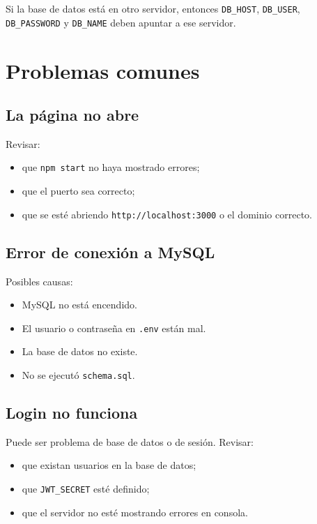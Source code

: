 \documentclass[12pt,letterpaper]{article}
\begin{document}
Si la base de datos está en otro servidor, entonces \texttt{DB\_HOST}, \texttt{DB\_USER}, \texttt{DB\_PASSWORD} y \texttt{DB\_NAME} deben apuntar a ese servidor.

\section{Problemas comunes}

\subsection{La página no abre}

Revisar:

\begin{itemize}
  \item que \texttt{npm start} no haya mostrado errores;
  \item que el puerto sea correcto;
  \item que se esté abriendo \texttt{http://localhost:3000} o el dominio correcto.
\end{itemize}

\subsection{Error de conexión a MySQL}

Posibles causas:

\begin{itemize}
  \item MySQL no está encendido.
  \item El usuario o contraseña en \texttt{.env} están mal.
  \item La base de datos no existe.
  \item No se ejecutó \texttt{schema.sql}.
\end{itemize}

\subsection{Login no funciona}

Puede ser problema de base de datos o de sesión. Revisar:

\begin{itemize}
  \item que existan usuarios en la base de datos;
  \item que \texttt{JWT\_SECRET} esté definido;
  \item que el servidor no esté mostrando errores en consola.
\end{itemize}
\end{document}
